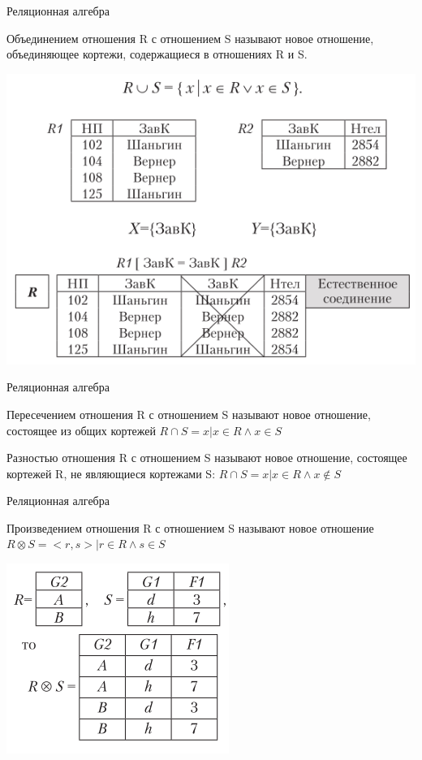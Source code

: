 \documentclass{beamer}
\begin{document}
\begin{frame}{Реляционная алгебра}
\begin{block}{Объединением отношения R с отношением S}
называют новое отношение, объединяющее кортежи, содержащиеся в отношениях R и S.
\end{block}
\begin{center}
\includegraphics[scale=0.50]{images/ra-05.png}
\end{center}
\end{frame}

\begin{frame}{Реляционная алгебра}
\begin{block}{Пересечением отношения R с отношением S}
называют новое отношение, состоящее из общих кортежей $R\cap S = {x|x\in R \wedge x\in S}$
\end{block}
\begin{block}{Разностью отношения R с отношением S}
называют новое отношение, состоящее кортежей R, не являющиеся кортежами S: $R\cap S = {x|x\in R \wedge x\notin S}$
\end{block}
\end{frame}

\begin{frame}{Реляционная алгебра}
\begin{block}{Произведением отношения R с отношением S}
называют новое отношение $R\otimes S = {<r,s>|r\in R\wedge s\in S}$
\end{block}
\begin{center}
\includegraphics[scale=0.50]{images/ra-06.png}
\end{center}
\end{frame}
\end{document}
